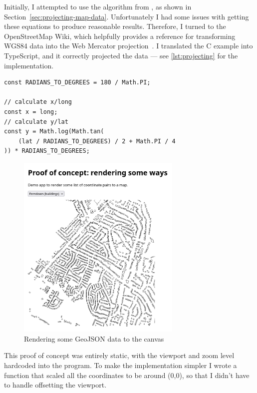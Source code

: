 \documentclass[hyphens]{final_report}
\begin{document}
Initially, I attempted to use the algorithm from \textcite[41]{snyder1987map}, as shown in Section~\ref{sec:projecting-map-data}. Unfortunately I had some issues with getting these equations to produce reasonable results. Therefore, I turned to the OpenStreetMap Wiki, which helpfully provides a reference for transforming WGS84 data into the Web Mercator projection~\cite{osm-wiki-mercator}. I translated the C example into TypeScript, and it correctly projected the data --- see \autoref{lst:projecting} for the implementation.

\begin{lstlisting}[caption=Projecting to Web Mercator, label=lst:projecting]
const RADIANS_TO_DEGREES = 180 / Math.PI;

// calculate x/long
const x = long;
// calculate y/lat
const y = Math.log(Math.tan(
    (lat / RADIANS_TO_DEGREES) / 2 + Math.PI / 4
)) * RADIANS_TO_DEGREES;
\end{lstlisting}

\begin{figure}[ht]
    \centering
    \includegraphics[width=0.7\textwidth]{../proof-of-concepts/2-rendering-a-way/screenshots/ferndown-buildings.png}
    \caption{Rendering some GeoJSON data to the canvas}\label{fig:rendering-geometry}
\end{figure}

This proof of concept was entirely static, with the viewport and zoom level hardcoded into the program. To make the implementation simpler I wrote a function that scaled all the coordinates to be around (0,0), so that I didn't have to handle offsetting the viewport.
\end{document}
